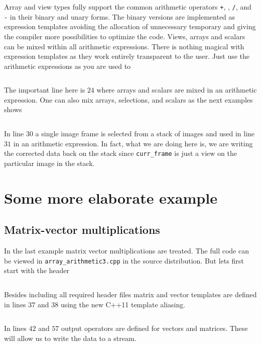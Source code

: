 Array and view types fully support the common arithmetic
operators {\tt +}, {\tt *}, {\tt /}, and {\tt -} in their binary and unary
forms. The binary versions are implemented as expression templates avoiding the
allocation of unnecessary temporary and giving the compiler more possibilities
to optimize the code. 
Views, arrays and scalars can be mixed within all arithmetic expressions. 
There is nothing magical with expression templates as they work entirely
transparent to the user. Just use the arithmetic expressions as you are used to
\inputminted[fontsize=\small,
             linenos,
             firstline=24,
             frame=lines,
             label=examples/array\_arithmetic1.cpp]
{cpp}{../examples/array_arithmetic1.cpp}
The important line here is $24$ where arrays and scalars are mixed in an
arithmetic expression.
One can also mix arrays, selections, and scalars as the next examples 
shows
\inputminted[fontsize=\small,
             linenos,
             firstline=24,
             frame=lines,
             label=examples/array\_arithmetic2.cpp]
{cpp}{../examples/array_arithmetic2.cpp}
In line $30$ a single image frame is selected from a stack of images and used in
line $31$ in an arithmetic expression. In fact, what we are doing here is,
we are writing the corrected data back on the stack since {\tt curr\_frame} is
just a view on the particular image in the stack.

\section{Some more elaborate example}
\subsection{Matrix-vector multiplications}
In the last example matrix vector multiplications are treated. The full code can
be viewed in {\tt array\_arithmetic3.cpp} in the source distribution. But lets
first start with the header
\inputminted[fontsize=\small,
             linenos,
             firstline=24,
             lastline=39,
             firstnumber=24,
             frame=lines,
             label=examples/array\_arithmetic3.cpp]
{cpp}{../examples/array_arithmetic3.cpp}
Besides including all required header files matrix and vector templates are 
defined in lines $37$ and $38$ using the new C++11 template aliasing.

\inputminted[fontsize=\small,
             linenos,
             firstline=40,
             lastline=63,
             firstnumber=40,
             frame=lines,
             label=examples/array\_arithmetic3.cpp]
{cpp}{../examples/array_arithmetic3.cpp}
In lines $42$ and $57$ output operators are defined for vectors and matrices.
These will allow us to write the data to a stream. 


